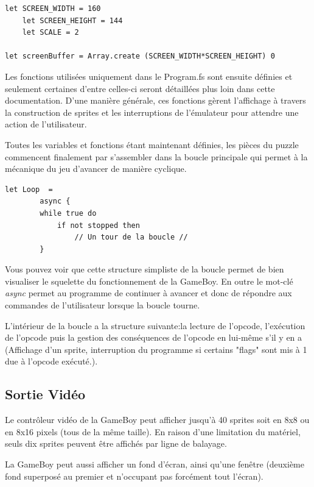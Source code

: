 \documentclass[12pt, a4paper]{article}
\begin{document}
\small{\begin{lstlisting}[frame=single]
 let SCREEN_WIDTH = 160 
    let SCREEN_HEIGHT = 144
    let SCALE = 2

let screenBuffer = Array.create (SCREEN_WIDTH*SCREEN_HEIGHT) 0
\end{lstlisting}}
\bigskip
\large

\pagebreak

Les fonctions utilisées uniquement dans le Program.fs sont ensuite définies et seulement certaines d'entre celles-ci seront détaillées plus loin dans cette documentation. D'une manière générale, ces fonctions gèrent l'affichage à travers la construction de sprites et les interruptions de l'émulateur pour attendre une action de l'utilisateur.
\bigskip

Toutes les variables et fonctions étant maintenant définies, les pièces du puzzle commencent finalement par s'assembler dans la boucle principale qui permet à la mécanique du jeu d'avancer de manière cyclique.

\small{\begin{lstlisting}[frame=single]
let Loop  =
        async {
        while true do
            if not stopped then
                // Un tour de la boucle //
        }
\end{lstlisting}}
\bigskip
\large

Vous pouvez voir que cette structure simpliste de la boucle permet de bien visualiser le squelette du fonctionnement de la GameBoy. En outre le mot-clé \textit{async} permet au programme de continuer à avancer et donc de répondre aux commandes de l'utilisateur lorsque la boucle tourne.  

\bigskip
L'intérieur de la boucle a la structure suivante:la lecture de l'opcode, l'exécution de l'opcode puis la gestion des conséquences de l'opcode en lui-même s'il y en a (Affichage d'un sprite, interruption du programme si certains "flags" sont mis à 1 due à l'opcode exécuté.). 

\pagebreak
\subsection{Sortie Vidéo}

Le contrôleur vidéo de la GameBoy peut afficher jusqu'à 40 sprites soit en 8x8 ou en 8x16 pixels (tous de la même taille). En raison d'une limitation du matériel, seuls dix sprites peuvent être affichés par ligne de balayage. 
\bigskip

La GameBoy peut aussi afficher un fond d'écran, ainsi qu'une fenêtre (deuxième fond superposé au premier et n'occupant pas forcément tout l'écran).
\end{document}
